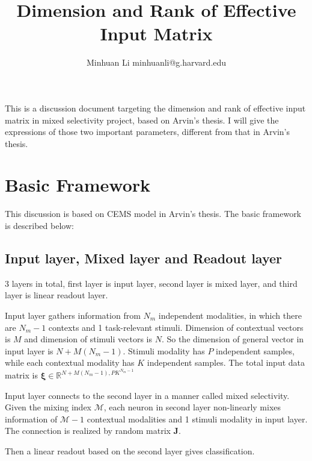 \documentclass[conference]{acmsiggraph}
\title{\huge Dimension and Rank of Effective Input Matrix}
\author{\Large Minhuan Li \quad minhuanli@g.harvard.edu}
\begin{document}
\maketitle

This is a discussion document targeting the dimension and rank of effective input matrix in mixed selectivity project, based on Arvin's thesis. I will give the expressions of those two important parameters, different from that in Arvin's thesis.


\section{Basic Framework}

This discussion is based on CEMS model in Arvin's thesis. The basic framework is described below: 

\subsection{Input layer, Mixed layer and Readout layer}

3 layers in total, first layer is input layer, second layer is mixed layer, and third layer is linear readout layer. 

Input layer gathers information from $N_m$ independent modalities, in which there are $N_m - 1$ contexts and 1 task-relevant stimuli. Dimension of contextual vectors is $M$ and dimension of stimuli vectors is $N$. So the dimension of general vector in input layer is $N + M(N_m-1)$. Stimuli modality has $P$ independent samples, while each contextual modality has $K$ independent samples. The total input data matrix is $\mathbf{\xi} \in \mathbb{R}^{N + M(N_m-1),PK^{N_m-1}}$

Input layer connects to the second layer in a manner called mixed selectivity. Given the mixing index $\mathcal{M}$, each neuron in second layer non-linearly mixes information of $\mathcal{M} - 1$ contextual modalities and 1 stimuli modality in input layer. The connection is realized by random matrix $\mathbf{J}$. 

Then a linear readout based on the second layer gives classification.
\end{document}
